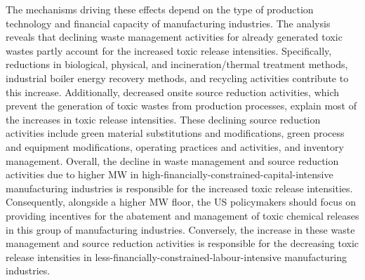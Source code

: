 \documentclass[12pt, english]{article}
\begin{document}
    The mechanisms driving these effects depend on the type of production technology and financial capacity of manufacturing industries. The analysis reveals that declining waste management activities for already generated toxic wastes partly account for the increased toxic release intensities. Specifically, reductions in biological, physical, and incineration/thermal treatment methods, industrial boiler energy recovery methods, and recycling activities contribute to this increase. Additionally, decreased onsite source reduction activities, which prevent the generation of toxic wastes from production processes, explain most of the increases in toxic release intensities. These declining source reduction activities include green material substitutions and modifications, green process and equipment modifications, operating practices and activities, and inventory management. Overall, the decline in waste management and source reduction activities due to higher MW in high-financially-constrained-capital-intensive manufacturing industries is responsible for the increased toxic release intensities. Consequently, alongside a higher MW floor, the US policymakers should focus on providing incentives for the abatement and management of toxic chemical releases in this group of manufacturing industries. Conversely, the increase in these waste management and source reduction activities is responsible for the decreasing toxic release intensities in less-financially-constrained-labour-intensive manufacturing industries.
\end{document}

